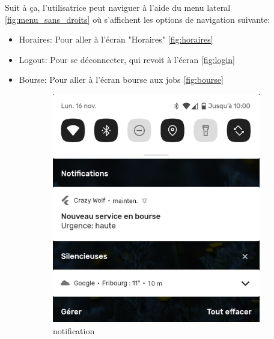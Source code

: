 Suit à ça, l'utilisatrice peut naviguer à l'aide du menu lateral \ref{fig:menu_sans_droits} où s'affichent les options
de navigation suivante: 
\begin{itemize}
    \item Horaires: Pour aller à l'écran "Horaires" \ref{fig:horaires}
    \item Logout: Pour se déconnecter, qui revoit à l'écran \ref{fig:login}
    \item Bourse: Pour aller à l'écran bourse aux jobs \ref{fig:bourse}
\end{itemize}
\begin{figure}[!h]
    \begin{subfigure}[]{.3\textwidth}
        \centering
        \includegraphics[width=0.9\linewidth]{screenshots/scenario_02/notification.png}
        \caption{notification}
        \label{fig:notif}
    \end{subfigure}
    \centering
    \begin{subfigure}{.3\textwidth}
        \centering

\end{subfigure}
\end{figure}
